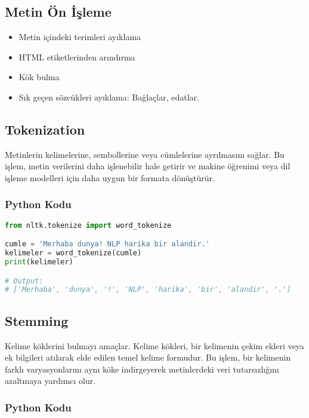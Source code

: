 \newpage

\subsection{Metin Ön İşleme}
\begin{itemize}
    \item Metin içindeki terimleri ayıklama
    \item HTML etiketlerinden arındırma
    \item Kök bulma
    \item Sık geçen sözcükleri ayıklama: Bağlaçlar, edatlar.
\end{itemize}

\newpage

\subsection{Tokenization}
Metinlerin kelimelerine, sembollerine veya cümlelerine ayrılmasını sağlar. Bu işlem, metin verilerini daha işlenebilir hale getirir ve makine öğrenimi veya dil işleme modelleri için daha uygun bir formata dönüştürür.

\subsubsection{Python Kodu}

\begin{lstlisting}[language=Python]
from nltk.tokenize import word_tokenize

cumle = 'Merhaba dunya! NLP harika bir alandir.'
kelimeler = word_tokenize(cumle)
print(kelimeler)

# Output:
# ['Merhaba', 'dunya', '!', 'NLP', 'harika', 'bir', 'alandir', '.']
\end{lstlisting}

\newpage

\subsection{Stemming}
Kelime köklerini bulmayı amaçlar. Kelime kökleri, bir kelimenin çekim ekleri veya ek bilgileri atılarak elde edilen temel kelime formudur. Bu işlem, bir kelimenin farklı varyasyonlarını aynı köke indirgeyerek metinlerdeki veri tutarsızlığını azaltmaya yardımcı olur.

\subsubsection{Python Kodu}

